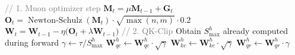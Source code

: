 \begin{algorithm}[t]
\caption{MuonClip Optimizer}
\label{alg:muonclip}
\begin{algorithmic}[1]
   \State \textcolor{gray}{// 1. Muon optimizer step}
        \State $\mathbf M_t = \mu \mathbf M_{t-1} + \mathbf G_t$ 
        \State $\mathbf O_t = \operatorname{Newton-Schulz}(\mathbf M_t)\cdot \sqrt{\max(n,m)}\cdot 0.2$ 
        \State $\mathbf W_t = \mathbf W_{t-1} - \eta \bigl(\mathbf O_t + \lambda \mathbf W_{t-1}\bigr)$ 
   \EndFor
   \State \textcolor{gray}{// 2. QK-Clip}
       \State Obtain $S_{\max}^{h}$ already computed during forward
           \State $\gamma \gets \tau / S_{\max}^{h}$
           \State $\mathbf W_{qc}^{h} \gets \mathbf W_{qc}^{h} \cdot \sqrt{\gamma}$
           \State $\mathbf W_{kc}^{h} \gets \mathbf W_{kc}^{h} \cdot \sqrt{\gamma}$
           \State $\mathbf W_{qr}^{h} \gets \mathbf W_{qr}^{h} \cdot \gamma$
       \EndIf
   \EndFor
\EndFor
\end{algorithmic}
\end{algorithm}
